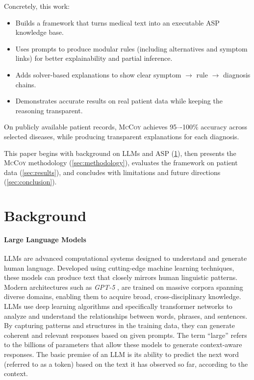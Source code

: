\documentclass[11pt,leqno]{amsart}
\newcommand{\sys}{\textsc{McCoy}\xspace}
\begin{document}
Concretely, this work:
\begin{itemize}
    \item Builds a framework that turns medical text into an executable ASP knowledge base.
    \item Uses prompts to produce modular rules (including alternatives and symptom links) for better explainability and partial inference.
    \item Adds solver-based explanations to show clear symptom $\rightarrow$ rule $\rightarrow$ diagnosis chains.
    \item Demonstrates accurate results on real patient data while keeping the reasoning transparent.
\end{itemize}

On publicly available patient records, \sys achieves 
95–-100\% accuracy across selected diseases, while producing transparent explanations for each diagnosis.

This paper begins with background on LLMs and ASP (\cref{sec:background}), 
then presents the \sys methodology (\cref{sec:methodology}), 
evaluates the framework on patient data (\cref{sec:results}),
and concludes with limitations and future directions (\cref{sec:conclusion}).

\section{Background}\label{sec:background}

\paragraph{\textbf{Large Language Models}}
LLMs \cite{zhao2023survey} are advanced computational systems 
designed to understand and generate human language. 
Developed using cutting-edge machine learning techniques, 
these models can produce text that closely mirrors human linguistic patterns.
Modern architectures such as \textit{GPT-5} \cite{openai2023gpt4, gpt5}, 
are trained on massive corpora spanning diverse domains, 
enabling them to acquire broad, cross-disciplinary knowledge. 
LLMs use deep learning algorithms \cite{Sarker2021} 
and specifically transformer networks \cite{Dosovitskiy2020} 
to analyze and understand the relationships between words, phrases, and sentences. 
By capturing patterns and structures in the training data, 
they can generate coherent and relevant responses based on given prompts.
The term “large” refers to the billions of parameters 
that allow these models to generate context-aware responses. 
The basic premise of an LLM is its ability to predict 
the next word (referred to as a token) based on the text it has observed so far, 
according to the context.
\end{document}
